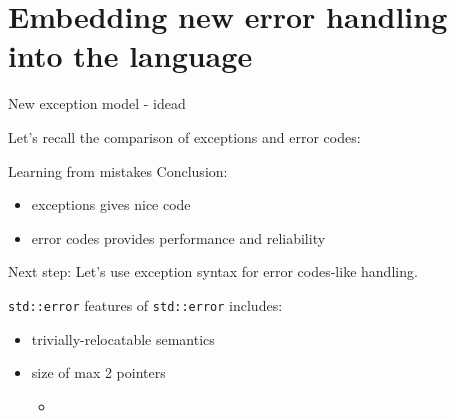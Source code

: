 \documentclass[10pt,a4paper]{beamer}
\begin{document}
\section{Embedding new error handling into the language}
\begin{frame}{New exception model - idea}d
	\begin{center}
		Let's recall the comparison of exceptions and error codes:
	\end{center}
	
	\begin{figure}
	\end{figure}
	
\end{frame}

\begin{frame}{Learning from mistakes}
	\centering
	Conclusion:
	
	\begin{itemize}
		\item exceptions gives nice code
		\item error codes provides performance and reliability
	\end{itemize}

	\begin{alertblock}{Next step:}
	Let's use exception syntax for error codes-like handling.
	\end{alertblock}
	
\end{frame}
	
\begin{frame}{\texttt{std::error}}
	features of \texttt{std::error} includes:
	\begin{itemize}
		\item trivially-relocatable semantics
		\item size of max 2 pointers
		\begin{itemize}
			\item 
		\end{itemize}
	\end{itemize}
\end{frame}
	
\end{document}
